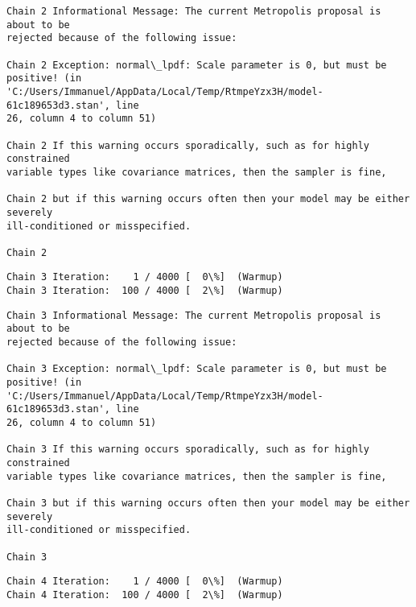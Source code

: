 \documentclass[11pt]{article}
\begin{document}
    \begin{Verbatim}[commandchars=\\\{\}]
Chain 2 Informational Message: The current Metropolis proposal is about to be
rejected because of the following issue:

Chain 2 Exception: normal\_lpdf: Scale parameter is 0, but must be positive! (in
'C:/Users/Immanuel/AppData/Local/Temp/RtmpeYzx3H/model-61c189653d3.stan', line
26, column 4 to column 51)

Chain 2 If this warning occurs sporadically, such as for highly constrained
variable types like covariance matrices, then the sampler is fine,

Chain 2 but if this warning occurs often then your model may be either severely
ill-conditioned or misspecified.

Chain 2

    \end{Verbatim}

    \begin{Verbatim}[commandchars=\\\{\}]
Chain 3 Iteration:    1 / 4000 [  0\%]  (Warmup)
Chain 3 Iteration:  100 / 4000 [  2\%]  (Warmup)
    \end{Verbatim}

    \begin{Verbatim}[commandchars=\\\{\}]
Chain 3 Informational Message: The current Metropolis proposal is about to be
rejected because of the following issue:

Chain 3 Exception: normal\_lpdf: Scale parameter is 0, but must be positive! (in
'C:/Users/Immanuel/AppData/Local/Temp/RtmpeYzx3H/model-61c189653d3.stan', line
26, column 4 to column 51)

Chain 3 If this warning occurs sporadically, such as for highly constrained
variable types like covariance matrices, then the sampler is fine,

Chain 3 but if this warning occurs often then your model may be either severely
ill-conditioned or misspecified.

Chain 3

    \end{Verbatim}

    \begin{Verbatim}[commandchars=\\\{\}]
Chain 4 Iteration:    1 / 4000 [  0\%]  (Warmup)
Chain 4 Iteration:  100 / 4000 [  2\%]  (Warmup)
    \end{Verbatim}
\end{document}
